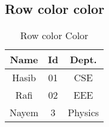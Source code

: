 \documentclass{article}
\begin{document}
\subsection{Row color color}

 \begin{table}[htp]
	\centering
	\begin{tabular}{|c|c|c|}
		\hline
	\rowcolor{red!20} Name & Id & Dept.\\
		\hline
	             	  Hasib &01 & CSE\\
		\hline
					   Rafi  &02 & EEE \\
		\hline
\rowcolor{green!20}    Nayem & 3 & Physics \\
		\hline
	\end{tabular}
	\caption{Row color Color}
 \end{table}






	
\end{document}
